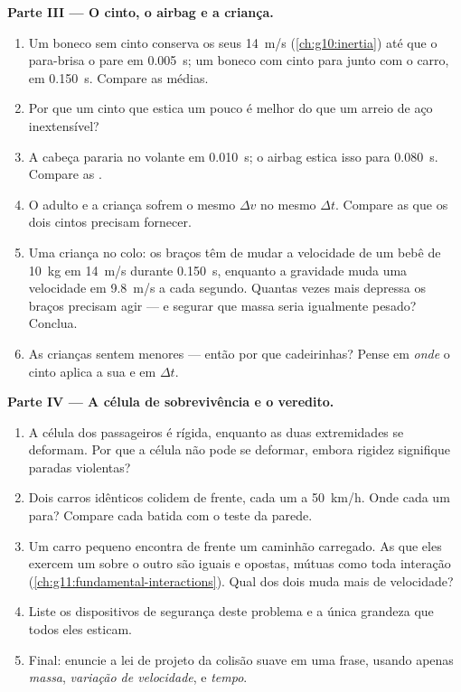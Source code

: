 \begin{problem}
\medskip
\noindent\textbf{Parte III --- O cinto, o airbag e a criança.}
\begin{enumerate}[resume]
  \item Um boneco sem cinto conserva os seus \qty{14}{m/s}
        (\cref{ch:g10:inertia}) até que o para-brisa o pare em
        \qty{0.005}{s}; um boneco com cinto para junto com o carro, em
        \qty{0.150}{s}. Compare as  médias.
  \item Por que um cinto que estica um pouco é melhor do que um arreio de
        aço inextensível?
  \item A cabeça pararia no volante em \qty{0.010}{s}; o airbag estica
        isso para \qty{0.080}{s}. Compare as .
  \item O adulto e a criança sofrem o mesmo $\Delta v$ no mesmo
        $\Delta t$. Compare as  que os dois cintos
        precisam fornecer.
  \item Uma criança no colo: os braços têm de mudar a velocidade de um
        bebê de \qty{10}{kg} em \qty{14}{m/s} durante \qty{0.150}{s},
        enquanto a gravidade muda uma velocidade em \qty{9.8}{m/s} a cada
        segundo. Quantas vezes mais depressa os braços precisam agir ---
        e segurar que massa seria igualmente pesado? Conclua.
  \item As crianças sentem  menores --- então por que cadeirinhas?
        Pense em \emph{onde} o cinto aplica a sua  e em $\Delta t$.
\end{enumerate}

\medskip
\noindent\textbf{Parte IV --- A célula de sobrevivência e o veredito.}
\begin{enumerate}[resume]
  \item A célula dos passageiros é rígida, enquanto as duas
        extremidades se deformam. Por que a célula não pode se deformar,
        embora rigidez signifique paradas violentas?
  \item Dois carros idênticos colidem de frente, cada um a
        \qty{50}{km/h}. Onde cada um para? Compare cada batida com o
        teste da parede.
  \item Um carro pequeno encontra de frente um caminhão carregado. As
         que eles exercem um sobre o outro são iguais e opostas,
        mútuas como toda interação
        (\cref{ch:g11:fundamental-interactions}). Qual dos dois muda mais
        de velocidade?
  \item Liste os dispositivos de segurança deste problema e a única
        grandeza que todos eles esticam.
  \item Final: enuncie a lei de projeto da colisão suave em uma frase,
        usando apenas \emph{massa}, \emph{variação de velocidade},
        \emph{} e \emph{tempo}.
\end{enumerate}
\end{problem}
